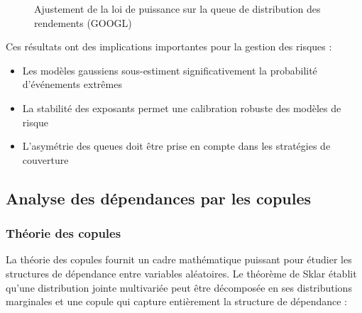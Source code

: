 \documentclass[12pt,a4paper]{article}
\theoremstyle{definition}
\theoremstyle{remark}
\begin{document}
\begin{figure}[h!]
\centering
{}
\caption{Ajustement de la loi de puissance sur la queue de distribution des rendements (GOOGL)}
\end{figure}

Ces résultats ont des implications importantes pour la gestion des risques :

\begin{itemize}
    \item Les modèles gaussiens sous-estiment significativement la probabilité d'événements extrêmes
    \item La stabilité des exposants permet une calibration robuste des modèles de risque
    \item L'asymétrie des queues doit être prise en compte dans les stratégies de couverture
\end{itemize}

\subsection{Analyse des dépendances par les copules}

\subsubsection{Théorie des copules}

La théorie des copules fournit un cadre mathématique puissant pour étudier les structures de dépendance entre variables aléatoires. Le théorème de Sklar établit qu'une distribution jointe multivariée peut être décomposée en ses distributions marginales et une copule qui capture entièrement la structure de dépendance :
\end{document}
